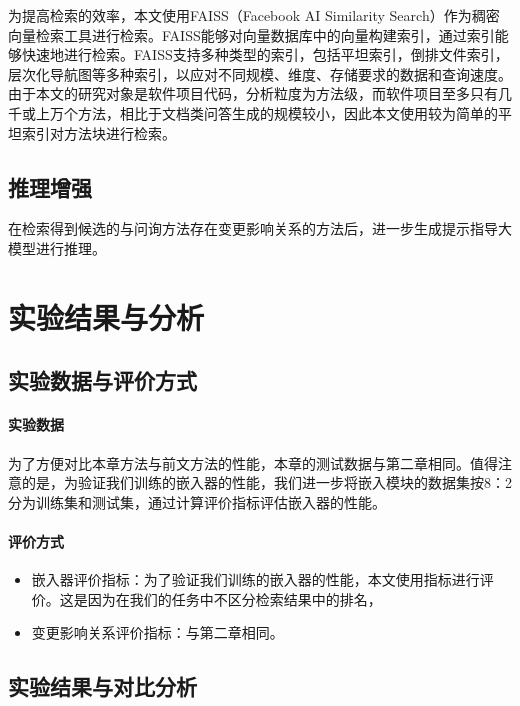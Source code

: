 为提高检索的效率，本文使用FAISS（Facebook AI Similarity Search）作为稠密向量检索工具进行检索。FAISS能够对向量数据库中的向量构建索引，通过索引能够快速地进行检索。FAISS支持多种类型的索引，包括平坦索引，倒排文件索引，层次化导航图等多种索引，以应对不同规模、维度、存储要求的数据和查询速度。由于本文的研究对象是软件项目代码，分析粒度为方法级，而软件项目至多只有几千或上万个方法，相比于文档类问答生成的规模较小，因此本文使用较为简单的平坦索引对方法块进行检索。


\subsection{推理增强}

在检索得到候选的与问询方法存在变更影响关系的方法后，进一步生成提示指导大模型进行推理。



\section{实验结果与分析}

\subsection{实验数据与评价方式}

\paragraph{实验数据} 为了方便对比本章方法与前文方法的性能，本章的测试数据与第二章相同。值得注意的是，为验证我们训练的嵌入器的性能，我们进一步将嵌入模块的数据集按8：2分为训练集和测试集，通过计算评价指标评估嵌入器的性能。

\paragraph{评价方式} 

\begin{itemize}

    \item 嵌入器评价指标：为了验证我们训练的嵌入器的性能，本文使用指标进行评价。这是因为在我们的任务中不区分检索结果中的排名，

    \item 变更影响关系评价指标：与第二章相同。
    
\end{itemize}

\subsection{实验结果与对比分析}


